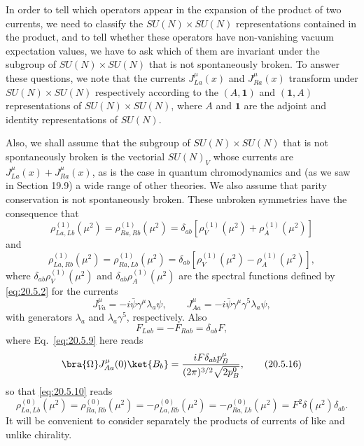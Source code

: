 In order to tell which operators appear in the expansion of the product of two currents, we need to classify the $SU(N)\times SU(N)$ representations contained in the product, and to tell whether these operators have non-vanishing vacuum expectation values, we have to ask which of them are invariant under the subgroup of $SU(N)\times SU(N)$ that is not spontaneously broken. To answer these questions, we note that the currents $J_{La}^\mu(x)$ and $J_{Ra}^\mu(x)$ transform under $SU(N)\times SU(N)$ respectively according to the $(A,\mathbf{1})$ and $(\mathbf{1},A)$ representations of $SU(N)\times SU(N)$, where $A$ and $\mathbf{1}$ are the adjoint and identity representations of $SU(N)$.

Also, we shall assume that the subgroup of $SU(N)\times SU(N)$ that is not spontaneously broken is the vectorial $SU(N)_V$ whose currents are $J_{La}^\mu(x)+J_{Ra}^\mu(x)$, as is the case in quantum chromodynamics and (as we saw in Section 19.9) a wide range of other theories. We also assume that parity conservation is not spontaneously broken. These unbroken symmetries have the consequence that
\begin{equation}
\rho_{La,Lb}^{(1)}(\mu^2)
=\rho_{Ra,Rb}^{(1)}(\mu^2)
=\delta_{ab}\left[
\rho_V^{(1)}(\mu^2)+\rho_A^{(1)}(\mu^2)
\right]
\tag{20.5.12}\label{eq:20.5.12}
\end{equation}
and
\begin{equation}
\rho_{La,Rb}^{(1)}(\mu^2)
=\rho_{Ra,Lb}^{(1)}(\mu^2)
=\delta_{ab}\left[
\rho_V^{(1)}(\mu^2)-\rho_A^{(1)}(\mu^2)
\right],
\tag{20.5.13}\label{eq:20.5.13}
\end{equation}
where $\delta_{ab}\rho_V^{(1)}(\mu^2)$ and $\delta_{ab}\rho_A^{(1)}(\mu^2)$ are the spectral functions defined by \eqref{eq:20.5.2} for the currents
\begin{equation}
J_{Va}^\mu=-i\bar\psi\gamma^\mu\lambda_a\psi,
\qquad
J_{Aa}^\mu=-i\bar\psi\gamma^\mu\gamma^5\lambda_a\psi,
\tag{20.5.14}\label{eq:20.5.14}
\end{equation}
with generators $\lambda_a$ and $\lambda_a\gamma^5$, respectively. Also
\begin{equation}
F_{Lab}=-F_{Rab}=\delta_{ab}F,
\tag{20.5.15}\label{eq:20.5.15}
\end{equation}
where Eq.~\eqref{eq:20.5.9} here reads
\begin{equation}
\bra{\Omega}J_{Aa}^\mu(0)\ket{B_b}
=\frac{iF\delta_{ab}p_B^\mu}{(2\pi)^{3/2}\sqrt{2p_B^0}},
\tag{20.5.16}\label{eq:20.5.16}
\end{equation}
so that \eqref{eq:20.5.10} reads
\begin{equation}
\rho_{La,Lb}^{(0)}(\mu^2)
=\rho_{Ra,Rb}^{(0)}(\mu^2)
=-\rho_{La,Rb}^{(0)}(\mu^2)
=-\rho_{Ra,Lb}^{(0)}(\mu^2)
=F^2\delta(\mu^2)\delta_{ab}.
\tag{20.5.17}\label{eq:20.5.17}
\end{equation}
It will be convenient to consider separately the products of currents of like and unlike chirality.


